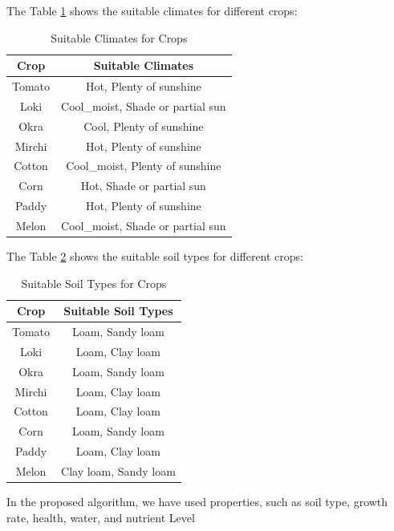 \documentclass[conference]{IEEEtran}
\begin{document}
The Table \ref{1} shows the suitable climates for different crops:
\begin{table}[h]
  \centering
    \caption{Suitable Climates for Crops}
  \begin{tabular}{|c|c|}
    \hline
    \textbf{Crop} & \textbf{Suitable Climates} \\
    \hline
    Tomato & Hot, Plenty of sunshine \\
    Loki & Cool\_moist, Shade or partial sun \\
    Okra & Cool, Plenty of sunshine \\
    Mirchi & Hot, Plenty of sunshine \\
    Cotton & Cool\_moist, Plenty of sunshine \\
    Corn & Hot, Shade or partial sun \\
    Paddy & Hot, Plenty of sunshine \\
    Melon & Cool\_moist, Shade or partial sun \\
    \hline
  \end{tabular}
  \label{1}
\end{table}
The Table \ref{2} shows the suitable soil types for different crops:
\begin{table}[h]
  \centering
    \caption{Suitable Soil Types for Crops}
  \begin{tabular}{|c|c|}
    \hline
    \textbf{Crop} & \textbf{Suitable Soil Types} \\
    \hline
    Tomato & Loam, Sandy loam \\
    Loki & Loam, Clay loam \\
    Okra & Loam, Sandy loam \\
    Mirchi & Loam, Clay loam \\
    Cotton & Loam, Clay loam \\
    Corn & Loam, Sandy loam \\
    Paddy & Loam, Clay loam \\
    Melon & Clay loam, Sandy loam \\
    \hline
  \end{tabular}
  \label{2}
\end{table}

In the proposed algorithm, we have used properties, such as soil type, growth rate, health, water, and nutrient Level
\end{document}
